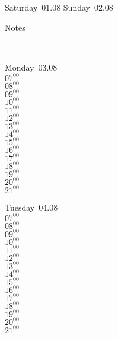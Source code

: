\documentclass[11pt,a4paper]{book}\usepackage[]{graphicx}\usepackage[]{color}
\begin{document}
{{{{{\begin{tcolorbox}
\end{tcolorbox} 
\begin{tcolorbox}[height=(\textheight-10mm)/6]
Saturday~01.08
\tcblower
Sunday~02.08
\end{tcolorbox} %
\begin{tcolorbox}[height=(\textheight-10mm)/6,sidebyside=false]
Notes
\end{tcolorbox}
\clearpage
\vspace{2 mm}\\
\begin{tcolorbox}
Monday~03.08\\
{ 
  $07^{00}$\\
$08^{00}$\\
$09^{00}$\\
$10^{00}$\\
$11^{00}$\\
$12^{00}$\\
$13^{00}$\\
$14^{00}$\\
$15^{00}$\\
$16^{00}$\\
$17^{00}$\\
$18^{00}$\\
$19^{00}$\\
$20^{00}$\\
$21^{00}$}\\

\end{tcolorbox}
\begin{tcolorbox}
Tuesday~04.08\\
{ 
  $07^{00}$\\
$08^{00}$\\
$09^{00}$\\
$10^{00}$\\
$11^{00}$\\
$12^{00}$\\
$13^{00}$\\
$14^{00}$\\
$15^{00}$\\
$16^{00}$\\
$17^{00}$\\
$18^{00}$\\
$19^{00}$\\
$20^{00}$\\
$21^{00}$}\\


\end{tcolorbox}}}}}}
\end{document}
